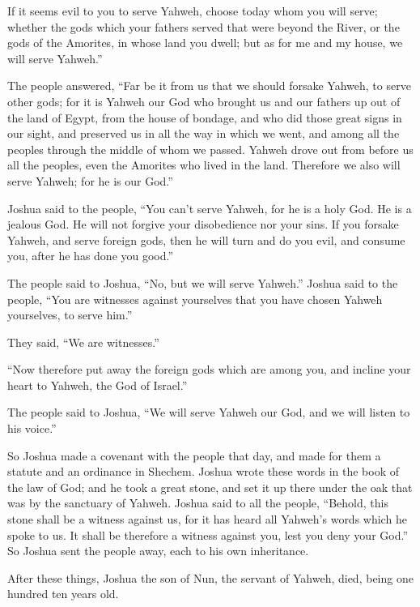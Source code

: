 {If it seems evil to you to serve Yahweh, choose today whom you will serve; whether the gods which your fathers served that were beyond the River, or the gods of the Amorites, in whose land you dwell; but as for me and my house, we will serve Yahweh.”
\par }{\PP {}The people answered, “Far be it from us that we should forsake Yahweh, to serve other gods;
for it is Yahweh our God who brought us and our fathers up out of the land of Egypt, from the house of bondage, and who did those great signs in our sight, and preserved us in all the way in which we went, and among all the peoples through the middle of whom we passed.
Yahweh drove out from before us all the peoples, even the Amorites who lived in the land. Therefore we also will serve Yahweh; for he is our God.”
\par }{\PP {}Joshua said to the people, “You can’t serve Yahweh, for he is a holy God. He is a jealous God. He will not forgive your disobedience nor your sins.
If you forsake Yahweh, and serve foreign gods, then he will turn and do you evil, and consume you, after he has done you good.”
\par }{\PP {}The people said to Joshua, “No, but we will serve Yahweh.”
Joshua said to the people, “You are witnesses against yourselves that you have chosen Yahweh yourselves, to serve him.”
\par }{\PP They said, “We are witnesses.”
\par }{\PP {}“Now therefore put away the foreign gods which are among you, and incline your heart to Yahweh, the God of Israel.”
\par }{\PP {}The people said to Joshua, “We will serve Yahweh our God, and we will listen to his voice.”
\par }{\PP {}So Joshua made a covenant with the people that day, and made for them a statute and an ordinance in Shechem.
Joshua wrote these words in the book of the law of God; and he took a great stone, and set it up there under the oak that was by the sanctuary of Yahweh.
Joshua said to all the people, “Behold, this stone shall be a witness against us, for it has heard all Yahweh’s words which he spoke to us. It shall be therefore a witness against you, lest you deny your God.”
So Joshua sent the people away, each to his own inheritance.
\par }{\PP {}After these things, Joshua the son of Nun, the servant of Yahweh, died, being one hundred ten years old.
}

